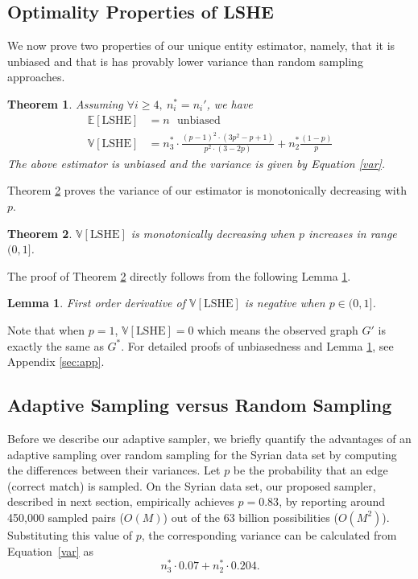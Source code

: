 \documentclass{imsart}
\newtheorem{lemma}{Lemma}
\newtheorem{theorem}{Theorem}
\begin{document}
\subsection{Optimality Properties of LSHE}
We now prove two properties of our unique entity estimator, namely, that it is unbiased and that is has provably lower variance than random sampling approaches.

\begin{theorem}
	\label{thm:thm1}
	Assuming  $\forall i \ge 4, \ n_i^* = n_i'$, we have
	\begin{align}\label{eq:thm1}
	\mathbb{E}[\text{LSHE}] &=  n   \ \ \ \mbox{unbiased} \\
	\label{var}
	\mathbb{V}[\text{LSHE}] &= n_3^* \cdot \frac{(p-1)^2 \cdot (3p^2-p+1)}{p^2 \cdot (3-2p)} + n_2^*\frac{(1-p)}{p}
	\end{align}
	The above estimator is unbiased and the variance is given by Equation \ref{var}.
\end{theorem}
Theorem \ref{thm:thm2} proves the variance of our estimator is monotonically decreasing with $p$.
\begin{theorem}
	\label{thm:thm2}
	$\mathbb{V}[\text{LSHE}]$ is monotonically decreasing when $p$ increases in  range $(0,1]$.
\end{theorem}

The proof of Theorem \ref{thm:thm2} directly follows from the following Lemma \ref{lemma}.
\begin{lemma}
	\label{lemma}
	First order derivative of $\mathbb{V}[\text{LSHE}]$ is negative when $p \in (0,1]$.
\end{lemma}
Note that when $p=1$, $\mathbb{V}[\text{LSHE}] = 0$ which means the observed graph $G'$ is exactly the same as $G^*$. For detailed proofs of unbiasedness and Lemma \ref{lemma}, see Appendix \ref{sec:app}.

\subsection{Adaptive Sampling versus Random Sampling}
\label{sec:randVsAdaptive}
Before we describe our adaptive sampler, we briefly quantify the advantages of an adaptive sampling over random sampling for the Syrian data set by computing the differences between their variances. Let $p$ be the probability that an edge (correct match) is sampled. On the Syrian data set, our proposed sampler, described in next section, empirically achieves $p = 0.83$, by reporting around 450,000 sampled pairs ($O(M)$) out of the 63 billion possibilities ($O(M^2)$). Substituting this value of $p$, the corresponding variance can be calculated from Equation~\ref{var} as $$n_3^* \cdot 0.07 + n_2^*\cdot 0.204.$$
\end{document}
